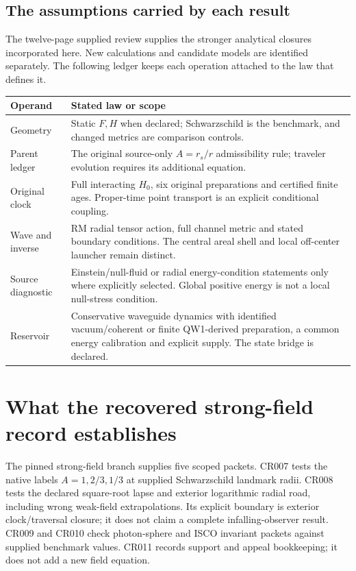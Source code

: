 \documentclass[10pt,twocolumn,letterpaper]{article}
\begin{document}
\subsection{The assumptions carried by each result}
The twelve-page supplied review supplies the stronger analytical closures
incorporated here.\cite{ch5review} New calculations and candidate models are
identified separately. The following ledger keeps each operation attached
to the law that defines it.
\begin{center}\small
\begin{tabularx}{\columnwidth}{@{}p{}X@{}}
\toprule
Operand & Stated law or scope\\\midrule
Geometry & Static $F,H$ when declared; Schwarzschild is the benchmark, and changed metrics are comparison controls.\\
Parent ledger & The original source-only $A=r_s/r$ admissibility rule; traveler evolution requires its additional equation.\\
Original clock & Full interacting $H_0$, six original preparations and certified finite ages. Proper-time point transport is an explicit conditional coupling.\\
Wave and inverse & RM radial tensor action, full channel metric and stated boundary conditions. The central areal shell and local off-center launcher remain distinct.\\
Source diagnostic & Einstein/null-fluid or radial energy-condition statements only where explicitly selected. Global positive energy is not a local null-stress condition.\\
Reservoir & Conservative waveguide dynamics with identified vacuum/coherent or finite QW1-derived preparation, a common energy calibration and explicit supply. The state bridge is declared.\\\bottomrule
\end{tabularx}
\end{center}


\section{What the recovered strong-field record establishes}
The pinned strong-field branch supplies five scoped packets. CR007 tests the native labels $A=1,2/3,1/3$ at supplied Schwarzschild landmark radii. CR008 tests the declared square-root lapse and exterior logarithmic radial road, including wrong weak-field extrapolations. Its explicit boundary is exterior clock/traversal closure; it does not claim a complete infalling-observer result. CR009 and CR010 check photon-sphere and ISCO invariant packets against supplied benchmark values. CR011 records support and appeal bookkeeping; it does not add a new field equation.\cite{courtroom}
\end{document}
